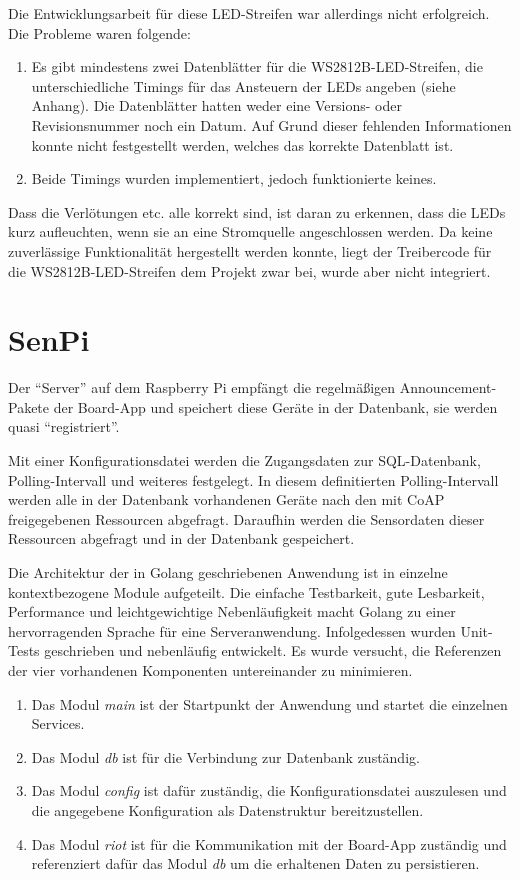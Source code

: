 \documentclass[a4paper]{article}
\begin{document}
Die Entwicklungsarbeit für diese LED-Streifen war allerdings nicht erfolgreich. Die Probleme waren folgende:
\begin{enumerate}
	\item Es gibt mindestens zwei Datenblätter für die WS2812B-LED-Streifen, die unterschiedliche Timings für das  Ansteuern der LEDs angeben (siehe Anhang). Die Datenblätter hatten weder eine Versions- oder Revisionsnummer noch ein Datum. Auf Grund dieser fehlenden Informationen konnte nicht festgestellt werden, welches das korrekte Datenblatt ist. 
    \item Beide Timings wurden implementiert, jedoch funktionierte keines.
\end{enumerate}
Dass die Verlötungen etc. alle korrekt sind, ist daran zu erkennen, dass die LEDs kurz aufleuchten, wenn sie an eine Stromquelle angeschlossen werden. Da keine zuverlässige Funktionalität hergestellt werden konnte, liegt der Treibercode für die WS2812B-LED-Streifen dem Projekt zwar bei, wurde aber nicht integriert. 

\section{SenPi}
Der \enquote{Server} auf dem Raspberry Pi empfängt die regelmäßigen Announcement-Pakete der Board-App und speichert diese Geräte in der Datenbank, sie werden quasi \enquote{registriert}.

Mit einer Konfigurationsdatei werden die Zugangsdaten zur SQL-Datenbank, Polling-Intervall und weiteres festgelegt. In diesem definitierten Polling-Intervall werden alle in der Datenbank vorhandenen Geräte nach den mit CoAP freigegebenen Ressourcen abgefragt. Daraufhin werden die Sensordaten dieser Ressourcen abgefragt und in der Datenbank gespeichert.

Die Architektur der in Golang geschriebenen Anwendung ist in einzelne kontextbezogene Module aufgeteilt. Die einfache Testbarkeit, gute Lesbarkeit, Performance und leichtgewichtige Nebenläufigkeit macht Golang zu einer hervorragenden Sprache für eine Serveranwendung. Infolgedessen wurden Unit-Tests geschrieben und nebenläufig entwickelt. Es wurde versucht, die Referenzen der vier vorhandenen Komponenten untereinander zu minimieren.
\begin{enumerate}
\item Das Modul \emph{main} ist der Startpunkt der Anwendung und startet die einzelnen Services. 
\item Das Modul \emph{db} ist für die Verbindung zur Datenbank zuständig. 
\item Das Modul \emph{config} ist dafür zuständig, die Konfigurationsdatei auszulesen und die angegebene Konfiguration als Datenstruktur bereitzustellen.
\item Das Modul \emph{riot} ist für die Kommunikation mit der Board-App zuständig und referenziert dafür das Modul \emph{db} um die erhaltenen Daten zu persistieren.
\end{enumerate}
\end{document}
